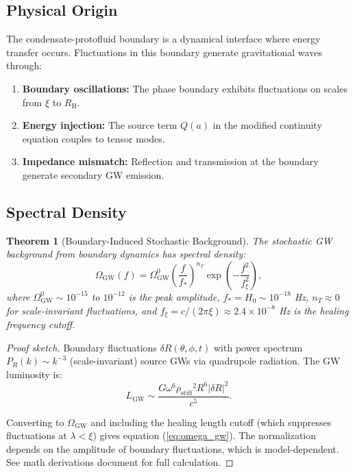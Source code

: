 \documentclass[11pt,a4paper]{article}
\newcommand{\rhostiff}{\ensuremath{\rho_{\mathrm{stiff}}}}
\newcommand{\RH}{\ensuremath{R_{\mathrm{H}}}}
\newtheorem{theorem}{Theorem}[section]
\theoremstyle{definition}
\theoremstyle{remark}
\begin{document}
\subsection{Physical Origin}
\label{sec:stochastic_origin}

The condensate-protofluid boundary is a dynamical interface where energy transfer occurs. Fluctuations in this boundary generate gravitational waves through:

\begin{enumerate}[label=(\arabic*)]
\item \textbf{Boundary oscillations:} The phase boundary exhibits fluctuations on scales from $\xi$ to $\RH$.
\item \textbf{Energy injection:} The source term $Q(a)$ in the modified continuity equation couples to tensor modes.
\item \textbf{Impedance mismatch:} Reflection and transmission at the boundary generate secondary GW emission.
\end{enumerate}

\subsection{Spectral Density}
\label{sec:spectral_density}

\begin{theorem}[Boundary-Induced Stochastic Background]
\label{thm:stochastic}
The stochastic GW background from boundary dynamics has spectral density:
\begin{equation}
\label{eq:omega_gw}
\boxed{\Omega_{\mathrm{GW}}(f) = \Omega_{\mathrm{GW}}^0\left(\frac{f}{f_*}\right)^{n_T}\exp\left(-\frac{f^2}{f_\xi^2}\right),}
\end{equation}
where $\Omega_{\mathrm{GW}}^0 \sim 10^{-15}$ to $10^{-12}$ is the peak amplitude, $f_* = H_0 \sim 10^{-18}$ Hz, $n_T \approx 0$ for scale-invariant fluctuations, and $f_\xi = c/(2\pi\xi) \approx 2.4 \times 10^{-8}$ Hz is the healing frequency cutoff.
\end{theorem}

\begin{proof}[Proof sketch]
Boundary fluctuations $\delta R(\theta,\phi,t)$ with power spectrum $P_R(k) \sim k^{-3}$ (scale-invariant) source GWs via quadrupole radiation. The GW luminosity is:
\begin{equation}
L_{\mathrm{GW}} \sim \frac{G\omega^6 \rhostiff^2 R^6 |\delta R|^2}{c^5}.
\end{equation}

Converting to $\Omega_{\mathrm{GW}}$ and including the healing length cutoff (which suppresses fluctuations at $\lambda < \xi$) gives equation (\ref{eq:omega_gw}). The normalization depends on the amplitude of boundary fluctuations, which is model-dependent. See math derivations document for full calculation.
\end{proof}
\end{document}
